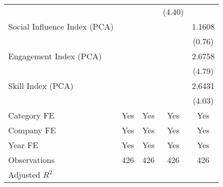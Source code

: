 {\begin{tabular}{l*{4}{c}}
                                   &                     &                     &      (4.40)         &                     \\
[1em]
Social Influence Index (PCA)       &                     &                     &                     &      1.1608         \\
                                   &                     &                     &                     &      (0.76)         \\
[1em]
Engagement Index (PCA)             &                     &                     &                     &      2.6758\sym{***}\\
                                   &                     &                     &                     &      (4.79)         \\
[1em]
Skill Index (PCA)                  &                     &                     &                     &      2.6431\sym{***}\\
                                   &                     &                     &                     &      (4.03)         \\
[1em]
Category FE                        &         Yes         &         Yes         &         Yes         &         Yes         \\
[1em]
Company FE                         &         Yes         &         Yes         &         Yes         &         Yes         \\
[1em]
Year FE                            &         Yes         &         Yes         &         Yes         &         Yes         \\
\hline
Observations                       &         426         &         426         &         426         &         426         \\
Adjusted \(R^{2}\)                 &                     &                     &                     &                     \\
\hline\hline
\end{tabular}
}
